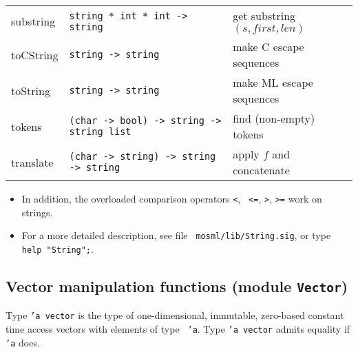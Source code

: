 \documentclass[fleqn,a4paper]{article}
\begin{document}
\begin{tabular}{@{\tt\ \ }lll}
substring & {\tt string * int * int -> string} & get substring
$(s, first, len)$\\

toCString  & {\tt string -> string} & make C escape sequences\\

toString  & {\tt string -> string} & make ML escape sequences\\

tokens    & {\tt (char -> bool) -> string -> string list} & find
(non-empty) tokens\\

translate & {\tt (char -> string) -> string -> string} & apply $f$ 
and concatenate\\\hline
\end{tabular}

\begin{itemize}

\item In addition, the overloaded comparison operators {\tt <}, {\tt
    <=}, {\tt >}, {\tt >=} work on strings.

\item For a more detailed description, see file {\tt
    mosml/lib/String.sig}, or type {\tt help "String";}.  
\end{itemize}


\newpage\subsection*{Vector manipulation functions (module {\tt Vector})}

Type {\tt 'a vector} is the type of one-dimensional, immutable,
zero-based constant time access vectors with elements of type {\tt
  'a}.  Type {\tt 'a vector} admits equality if {\tt 'a} does.

\vspace{1ex}
\end{document}
